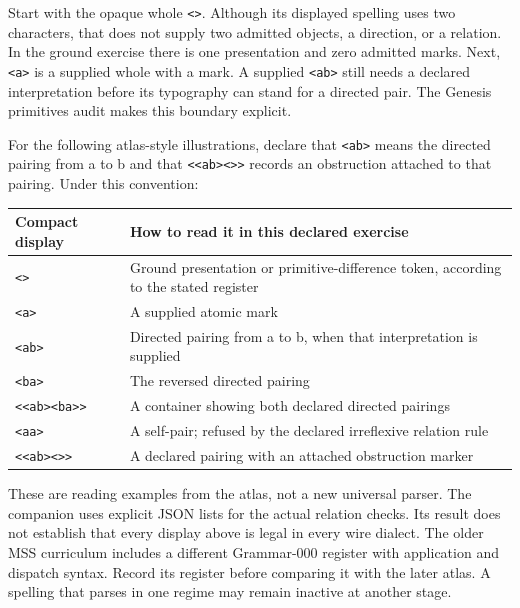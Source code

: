 \documentclass[
  11pt,
]{article}
\newcommand{\passthrough}[1]{#1}
\begin{document}
Start with the opaque whole \passthrough{\lstinline!<>!}. Although its
displayed spelling uses two characters, that does not supply two
admitted objects, a direction, or a relation. In the ground exercise
there is one presentation and zero admitted marks. Next,
\passthrough{\lstinline!<a>!} is a supplied whole with a mark. A
supplied \passthrough{\lstinline!<ab>!} still needs a declared
interpretation before its typography can stand for a directed pair. The
Genesis primitives audit makes this boundary explicit.

For the following atlas-style illustrations, declare that
\passthrough{\lstinline!<ab>!} means the directed pairing from a to b
and that \passthrough{\lstinline!<<ab><>>!} records an obstruction
attached to that pairing. Under this convention:

\begin{longtable}[]{@{}
  >{\raggedright\arraybackslash}p{}
  >{\raggedright\arraybackslash}p{}@{}}
\toprule\noalign{}
\begin{minipage}[b]{\linewidth}\raggedright
Compact display
\end{minipage} & \begin{minipage}[b]{\linewidth}\raggedright
How to read it in this declared exercise
\end{minipage} \\
\midrule\noalign{}
\endhead
\bottomrule\noalign{}
\endlastfoot
\passthrough{\lstinline!<>!} & Ground presentation or
primitive-difference token, according to the stated register \\
\passthrough{\lstinline!<a>!} & A supplied atomic mark \\
\passthrough{\lstinline!<ab>!} & Directed pairing from a to b, when that
interpretation is supplied \\
\passthrough{\lstinline!<ba>!} & The reversed directed pairing \\
\passthrough{\lstinline!<<ab><ba>>!} & A container showing both declared
directed pairings \\
\passthrough{\lstinline!<aa>!} & A self-pair; refused by the declared
irreflexive relation rule \\
\passthrough{\lstinline!<<ab><>>!} & A declared pairing with an attached
obstruction marker \\
\end{longtable}

These are reading examples from the atlas, not a new universal parser.
The companion uses explicit JSON lists for the actual relation checks.
Its result does not establish that every display above is legal in every
wire dialect. The older MSS curriculum includes a different Grammar-000
register with application and dispatch syntax. Record its register
before comparing it with the later atlas. A spelling that parses in one
regime may remain inactive at another stage.
\end{document}
